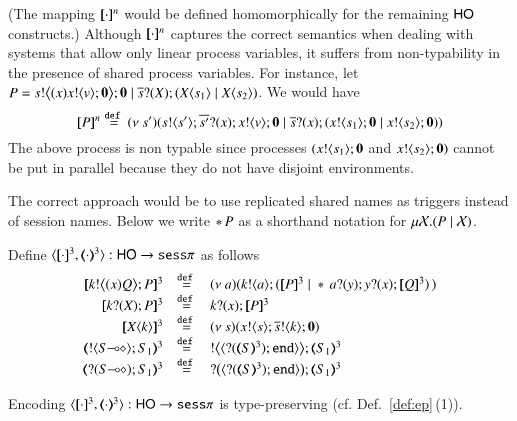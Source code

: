 (The mapping $[\!\![\cdot]\!\!]^n$ would be defined homomorphically for the remaining $\mathsf{HO}$ constructs.)
Although $[\!\![\cdot]\!\!]^n$ captures the correct semantics when
dealing with systems that allow only linear process variables,
it suffers from non-typability in the presence
of shared process variables. For instance,
let $P = s ! \big\langle (x)x ! \langle v \rangle ;\mathbf{0} \big\rangle ; \mathbf{0} \;|\; \overline{s} ? (X) ; (X\langle s_1 \rangle \;|\; X\langle s_2 \rangle)$.
We would have
\[
	[\!\![P]\!\!]^n \stackrel{\mathtt{def}\ }{=}
	(\nu\ s')(s ! \langle s' \rangle ; \overline{s'} ? (x) ; x ! \langle v \rangle ; \mathbf{0} \;|\; \overline{s} ? (x) ; (x ! \langle s_1 \rangle ; \mathbf{0} \;|\; x ! \langle s_2 \rangle ; \mathbf{0}))
\]
The above process is non typable since processes $(x ! \langle s_1 \rangle ; \mathbf{0}$ and $x ! \langle s_2 \rangle ; \mathbf{0})$
cannot be put in parallel because they do not have disjoint environments.

The correct approach would be to use replicated shared names
as triggers instead of session names. 
Below we write $\ast\,{} P$ as a shorthand notation for $\mu \mathcal{X}. (P \;|\; \mathcal{X})$.

\begin{definition}
  Define $\encod{\cdot}{\cdot}{3}: \HO \to \sesp$ as follows
  \[
	\begin{array}{rcl}
		\pmap{\bbout{k}{\abs{x} Q} P}{3} & \defeq &  \newsp{a}{\bout{k}{a} (\pmap{P}{3} \Par \repl{} \binp{a}{y} \binp{y}{x} \pmap{Q}{3})\,} \\
		\pmap{\binp{k}{X} P}{3} &\defeq&  \binp{k}{x} \pmap{P}{3}\\
		\pmap{\appl{X}{k}}{3} & \defeq & \newsp{s}{\bout{x}{s} \bout{\dual{s}}{k} \inact}\\
		\tmap{\btout{\lhot{S}}S_1}{3} & \defeq & \bbtout{\chtype{\btinp{\tmap{S}{3}}\tinact}}\tmap{S_1}{3} \\
		\tmap{\btinp{\lhot{S}}S_1}{3} & \defeq & \bbtinp{\chtype{\btinp{\tmap{S}{3}}\tinact}}\tmap{S_1}{3}
	\end{array}
	\]
\end{definition}

\begin{proposition}
	Encoding $\encod{\cdot}{\cdot}{3}: \HO \to \sesp$  is type-preserving (cf. Def.~\ref{def:ep}\,(1)).
\end{proposition}

